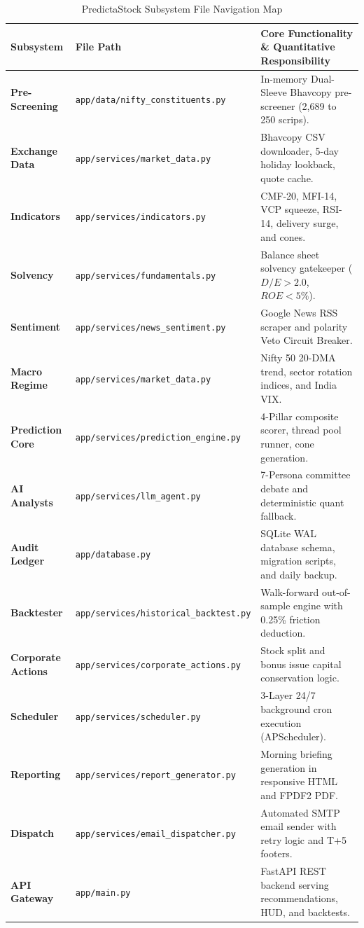 \documentclass[11pt,a4paper]{article}
\begin{document}
\begin{table}[h!]
\centering
\small
\begin{tabularx}{\textwidth}{llX}
\toprule
\textbf{Subsystem} & \textbf{File Path} & \textbf{Core Functionality \& Quantitative Responsibility} \\
\midrule
\textbf{Pre-Screening} & \texttt{app/data/nifty\_constituents.py} & In-memory Dual-Sleeve Bhavcopy pre-screener (2,689 to 250 scrips). \\
\textbf{Exchange Data} & \texttt{app/services/market\_data.py} & Bhavcopy CSV downloader, 5-day holiday lookback, quote cache. \\
\textbf{Indicators} & \texttt{app/services/indicators.py} & CMF-20, MFI-14, VCP squeeze, RSI-14, delivery surge, and cones. \\
\textbf{Solvency} & \texttt{app/services/fundamentals.py} & Balance sheet solvency gatekeeper ($D/E > 2.0$, $ROE < 5\%$). \\
\textbf{Sentiment} & \texttt{app/services/news\_sentiment.py} & Google News RSS scraper and polarity Veto Circuit Breaker. \\
\textbf{Macro Regime} & \texttt{app/services/market\_data.py} & Nifty 50 20-DMA trend, sector rotation indices, and India VIX. \\
\textbf{Prediction Core} & \texttt{app/services/prediction_engine.py} & 4-Pillar composite scorer, thread pool runner, cone generation. \\
\textbf{AI Analysts} & \texttt{app/services/llm_agent.py} & 7-Persona committee debate and deterministic quant fallback. \\
\textbf{Audit Ledger} & \texttt{app/database.py} & SQLite WAL database schema, migration scripts, and daily backup. \\
\textbf{Backtester} & \texttt{app/services/historical_backtest.py} & Walk-forward out-of-sample engine with 0.25\% friction deduction. \\
\textbf{Corporate Actions} & \texttt{app/services/corporate_actions.py} & Stock split and bonus issue capital conservation logic. \\
\textbf{Scheduler} & \texttt{app/services/scheduler.py} & 3-Layer 24/7 background cron execution (APScheduler). \\
\textbf{Reporting} & \texttt{app/services/report_generator.py} & Morning briefing generation in responsive HTML and FPDF2 PDF. \\
\textbf{Dispatch} & \texttt{app/services/email_dispatcher.py} & Automated SMTP email sender with retry logic and T+5 footers. \\
\textbf{API Gateway} & \texttt{app/main.py} & FastAPI REST backend serving recommendations, HUD, and backtests. \\
\bottomrule
\end{tabularx}
\caption{PredictaStock Subsystem File Navigation Map}
\end{table}
\end{document}
